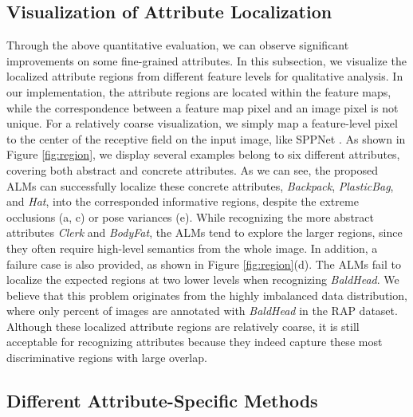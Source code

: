 \documentclass[10pt,twocolumn,letterpaper]{article}
\begin{document}
\subsection{Visualization of Attribute Localization}
Through the above quantitative evaluation, we can observe significant improvements on some fine-grained attributes.
In this subsection, we visualize the localized attribute regions from different feature levels for qualitative analysis.
In our implementation, the attribute regions are located within the feature maps, while the correspondence between a feature map pixel and an image pixel is not unique.
For a relatively coarse visualization, we simply map a feature-level pixel to the center of the receptive field on the input image, like SPPNet \cite{he2015spatial}.
As shown in Figure \ref{fig:region}, we display several examples belong to six different attributes, covering both abstract and concrete attributes.
As we can see, the proposed ALMs can successfully localize these concrete attributes, \eg \textit{Backpack}, \textit{PlasticBag}, and \textit{Hat}, into the corresponded informative regions, despite the extreme occlusions (a, c) or pose variances (e).
While recognizing the more abstract attributes \textit{Clerk} and \textit{BodyFat}, the ALMs tend to explore the larger regions, since they often require high-level semantics from the whole image.
In addition, a failure case is also provided, as shown in Figure \ref{fig:region}(d).
The ALMs fail to localize the expected regions at two lower levels when recognizing \textit{BaldHead}.
We believe that this problem originates from the highly imbalanced data distribution, where only  percent of images are annotated with \textit{BaldHead} in the RAP dataset.
Although these localized attribute regions are relatively coarse, it is still acceptable for recognizing attributes because they indeed capture these most discriminative regions with large overlap.


\subsection{Different Attribute-Specific Methods} \label{sec4_4}
\end{document}
